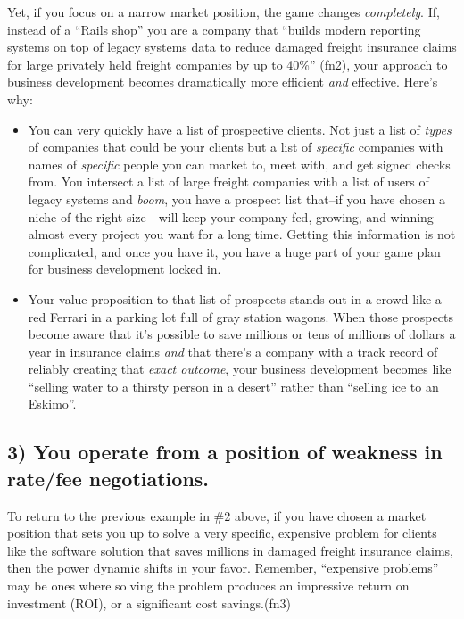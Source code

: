 Yet, if you focus on a narrow market position, the game changes \emph{completely}. If, instead of a ``Rails shop'' you are a company that ``builds modern reporting systems on top of legacy systems data to reduce damaged freight insurance claims for large privately held freight companies by up to 40\%'' (fn2), your approach to business development becomes dramatically more efficient \emph{and} effective. Here’s why:

\begin{itemize}
\item You can very quickly have a list of prospective clients. Not just a list of \emph{types} of companies that could be your clients but a list of \emph{specific} companies with names of \emph{specific} people you can market to, meet with, and get signed checks from. You intersect a list of large freight companies with a list of users of legacy systems and \emph{boom}, you have a prospect list that--if you have chosen a niche of the right size—will keep your company fed, growing, and winning almost every project you want for a long time. Getting this information is not complicated, and once you have it, you have a huge part of your game plan for business development locked in.
\item Your value proposition to that list of prospects stands out in a crowd like a red Ferrari in a parking lot full of gray station wagons. When those prospects become aware that it's possible to save millions or tens of millions of dollars a year in insurance claims \emph{and} that there's a company with a track record of reliably creating that \emph{exact outcome}, your business development becomes like ``selling water to a thirsty person in a desert'' rather than ``selling ice to an Eskimo''.
\end{itemize}

\subsection{3) \textbf{You operate from a position of weakness in rate/fee negotiations}.}

To return to the previous example in \#2 above, if you have chosen a market position that sets you up to solve a very specific, expensive problem for clients like the software solution that saves millions in damaged freight insurance claims, then the power dynamic shifts in your favor. Remember, ``expensive problems'' may be ones where solving the problem produces an impressive return on investment (ROI), or a significant cost savings.(fn3)

